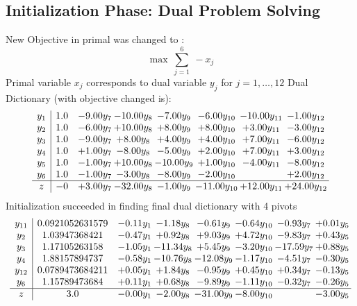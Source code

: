 \documentclass[8pt]{article}
\begin{document}
\subsection{Initialization Phase: Dual Problem Solving}
New Objective in primal was changed to : \[ \max\ \sum_{j=1}^{6}\ - x_j \] 
Primal variable $x_j$ corresponds to dual variable $y_j$ for $j = 1,\ldots,12$
Dual Dictionary (with objective changed is): 
\[\begin{array}{c| c c@{\hskip 2pt} c@{\hskip 2pt} c@{\hskip 2pt} c@{\hskip 2pt} c@{\hskip 2pt} c@{\hskip 2pt} }
 y_{1}   &  1.0 & -9.00 y_{7} & -10.00 y_{8} & -7.00 y_{9} & -6.00 y_{10} & -10.00 y_{11} & -1.00 y_{12}\\
 y_{2}   &  1.0 & -6.00 y_{7} & + 10.00 y_{8} & +  8.00 y_{9} & +  8.00 y_{10} & +  3.00 y_{11} & -3.00 y_{12}\\
 y_{3}   &  1.0 & -9.00 y_{7} & +  8.00 y_{8} & +  4.00 y_{9} & +  4.00 y_{10} & +  7.00 y_{11} & -6.00 y_{12}\\
 y_{4}   &  1.0 & +  1.00 y_{7} & -8.00 y_{8} & -5.00 y_{9} & +  2.00 y_{10} & +  7.00 y_{11} & +  3.00 y_{12}\\
 y_{5}   &  1.0 & -1.00 y_{7} & + 10.00 y_{8} & -10.00 y_{9} & +  1.00 y_{10} & -4.00 y_{11} & -8.00 y_{12}\\
 y_{6}   &  1.0 & -1.00 y_{7} & -3.00 y_{8} & -8.00 y_{9} & -2.00 y_{10} &   & +  2.00 y_{12}\\
\hline
z    &  -0 & +  3.00 y_{7} & -32.00 y_{8} & -1.00 y_{9} & -11.00 y_{10} & + 12.00 y_{11} & + 24.00 y_{12}\\
\end{array}\]
Initialization succeeded in finding final dual dictionary with 4 pivots
\[\begin{array}{c| c c@{\hskip 2pt} c@{\hskip 2pt} c@{\hskip 2pt} c@{\hskip 2pt} c@{\hskip 2pt} c@{\hskip 2pt} }
 y_{11}   &  0.0921052631579 & -0.11 y_{1} & -1.18 y_{8} & -0.61 y_{9} & -0.64 y_{10} & -0.93 y_{7} & +  0.01 y_{5}\\
 y_{2}   &  1.03947368421 & -0.47 y_{1} & +  0.92 y_{8} & +  9.03 y_{9} & +  4.72 y_{10} & -9.83 y_{7} & +  0.43 y_{5}\\
 y_{3}   &  1.17105263158 & -1.05 y_{1} & -11.34 y_{8} & +  5.45 y_{9} & -3.20 y_{10} & -17.59 y_{7} & +  0.88 y_{5}\\
 y_{4}   &  1.88157894737 & -0.58 y_{1} & -10.76 y_{8} & -12.08 y_{9} & -1.17 y_{10} & -4.51 y_{7} & -0.30 y_{5}\\
 y_{12}   &  0.0789473684211 & +  0.05 y_{1} & +  1.84 y_{8} & -0.95 y_{9} & +  0.45 y_{10} & +  0.34 y_{7} & -0.13 y_{5}\\
 y_{6}   &  1.15789473684 & +  0.11 y_{1} & +  0.68 y_{8} & -9.89 y_{9} & -1.11 y_{10} & -0.32 y_{7} & -0.26 y_{5}\\
\hline
z    &  3.0 & -0.00 y_{1} & -2.00 y_{8} & -31.00 y_{9} & -8.00 y_{10} &   & -3.00 y_{5}\\
\end{array}\]
\end{document}
